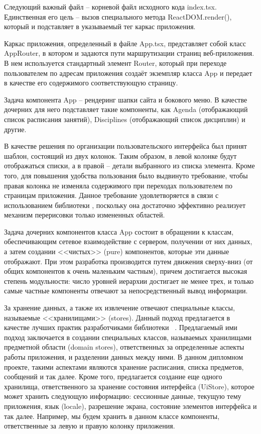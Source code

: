 Следующий важный файл -- корневой файл исходного \typescript кода index.tsx. Единственная его цель -- вызов специального метода React\-DOM.ren\-der(), который и подставляет в указываемый тег каркас приложения.

Каркас приложения, определенный в файле App.tsx, представляет собой класс AppRouter, в котором и задаются пути маршрутизации страниц веб-приложения. В нем используется стандартный элемент Router, который при переходе пользователем по адресам приложения создаёт экземпляр класса App и передает в качестве его содержимого соответствующую страницу.

Задача компонента App -- рендеринг шапки сайта и бокового меню. В качестве дочерних для него \react подставляет такие компоненты, как Agenda (отображающий список расписания занятий), Disciplines (отображающий список дисциплин) и другие.

В качестве решения по организации пользовательского интерфейса был принят шаблон, состоящий из двух колонок. Таким образом, в левой колонке будут отображаться списки, а в правой -- детали выбранного из списка элемента. Кроме того, для повышения удобства пользования было выдвинуто требование, чтобы правая колонка не изменяла содержимого при переходах пользователем по страницам приложения. Данное требование удовлетворяется в связи с использованием библиотеки \react, поскольку она достаточно эффективно реализует механизм перерисовки только измененных областей. 

Задача дочерних компонентов класса App состоит в обращении к классам, обеспечивающим сетевое взаимодействие с сервером, получении от них данных, а затем создании <<чистых>> (pure) компонентов, которые эти данные отображают. При этом разработка производится путем движения сверху-вниз (от общих компонентов к очень маленьким частным), причем достигается высокая степень модульности: число уровней иерархии достигает не менее трех, и только самые частные компоненты отвечают за непосредственный вывод информации.

За хранение данных, а также их извлечение отвечают специальные классы, называемые <<хранилищами>> (stores). Данный подход предлагается в качестве лучших практик разработчиками библиотеки \mobx~\cite{mobx_best_practices}. Предлагаемый ими подход заключается в создании специальных классов, называемых хранилищами предметной области (domain stores), ответственных за определенные аспекты работы приложения, и разделении данных между ними. В данном дипломном проекте, такими аспектами являются хранение расписания, списка предметов, сообщений и так далее. Кроме того, предлагается создание еще одного хранилища, ответственного за хранение состояния интерфейса (UiStore), которое может хранить следующую информацию: сессионные данные, текущую тему приложения, язык (locale), разрешение экрана, состояние элементов интерфейса и так далее. Например, мы будем хранить в данном классе компоненты, ответственные за левую и правую колонку приложения.

